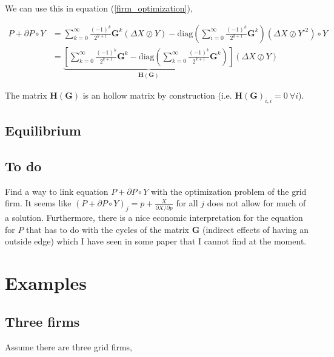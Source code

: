 \documentclass[american]{scrartcl}
\newcommand{\matr}[1]{\bm{#1}}
\newcommand{\diag}{\text{diag}}
\begin{document}
We can use this in equation (\ref{firm_optimization}),

\begin{equation} \label{foc_grid}
	\begin{split}
		P + \partial P \circ Y &= \sum^{\infty}_{k=0}\frac{(-1)^k}{2^{k+1}} \matr{G}^k (\Delta X \oslash Y) - \diag\left(\sum^\infty_{i=0} \frac{(-1)^k}{2^{k+1}} \matr{G}^k\right) (\Delta X \oslash Y^{\circ 2}) \circ Y \\
		&= \underbrace{\left[ \sum^{\infty}_{k=0}\frac{(-1)^k}{2^{k+1}} \matr{G}^k - \diag \left( \sum^{\infty}_{k=0}\frac{(-1)^k}{2^{k+1}} \matr{G}^k \right) \right]}_{\matr{H(G)}} (\Delta X \oslash Y)
	\end{split}
\end{equation}

The matrix $\matr{H(G)}$ is an hollow matrix by construction (i.e. $\matr{H(G)}_{i, i} = 0 \ \forall i$).

\subsection{Equilibrium}

\subsection{To do}

Find a way to link equation $P + \partial P \circ Y$ with the optimization problem of the grid firm. It seems like $(P + \partial P \circ Y)_j = p + \frac{X}{\partial X / \partial p}$ for all $j$ does not allow for much of a solution. Furthermore, there is a nice economic interpretation for the equation for $P$ that has to do with the cycles of the matrix $\matr{G}$ (indirect effects of having an outside edge) which I have seen in some paper that I cannot find at the moment.

\newpage %

\section{Examples}

\subsection{Three firms}

Assume there are three grid firms, \hspace{2em}
\end{document}
